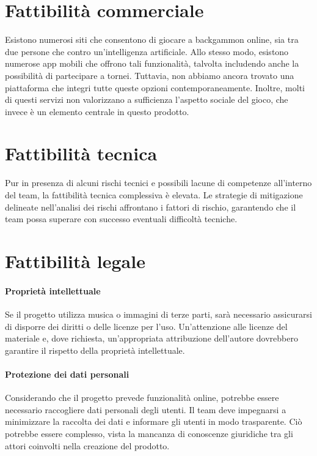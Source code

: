 \documentclass[12pt,a4paper]{report}
\begin{document}
\section{Fattibilità commerciale}
Esistono numerosi siti che consentono di giocare a backgammon online, sia tra due persone che contro un'intelligenza artificiale. Allo stesso modo, esistono numerose app mobili che offrono tali funzionalità, talvolta includendo anche la possibilità di partecipare a tornei. Tuttavia, non abbiamo ancora trovato una piattaforma che integri tutte queste opzioni contemporaneamente. Inoltre, molti di questi servizi non valorizzano a sufficienza l'aspetto sociale del gioco, che invece è un elemento centrale in questo prodotto.

\section{Fattibilità tecnica}
Pur in presenza di alcuni rischi tecnici e possibili lacune di competenze all'interno del team, la fattibilità tecnica complessiva è elevata. Le strategie di mitigazione delineate nell'analisi dei rischi affrontano i fattori di rischio, garantendo che il team possa superare con successo eventuali difficoltà tecniche.

\section{Fattibilità legale}

\paragraph{Proprietà intellettuale}
Se il progetto utilizza musica o immagini di terze parti, sarà necessario assicurarsi di disporre dei diritti o delle licenze per l'uso. Un'attenzione alle licenze del materiale e, dove richiesta, un'appropriata attribuzione dell'autore dovrebbero garantire il rispetto della proprietà intellettuale.

\paragraph{Protezione dei dati personali}
Considerando che il progetto prevede funzionalità online, potrebbe essere necessario raccogliere dati personali degli utenti. Il team deve impegnarsi a minimizzare la raccolta dei dati e informare gli utenti in modo trasparente. Ciò potrebbe essere complesso, vista la mancanza di conoscenze giuridiche tra gli attori coinvolti nella creazione del prodotto.
\end{document}
